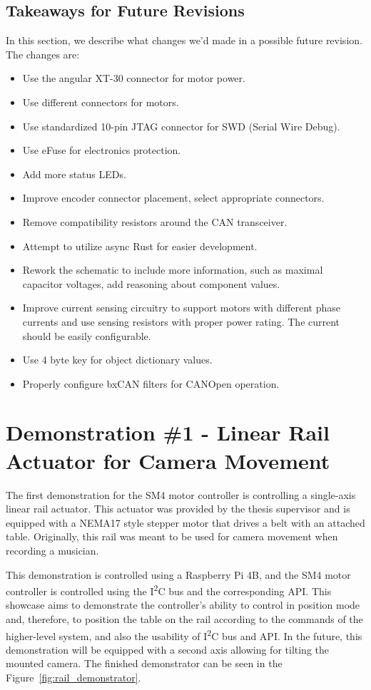 \subsection{Takeaways for Future Revisions}
\label{subsec:final_takeaways}
In this section, we describe what changes we'd made in a possible future revision.
The changes are:
\begin{itemize}
    \item Use the angular XT-30 connector for motor power.
    \item Use different connectors for motors.
    \item Use standardized 10-pin JTAG connector for SWD (Serial Wire Debug).
    \item Use eFuse for electronics protection.
    \item Add more status LEDs.
    \item Improve encoder connector placement, select appropriate connectors.
    \item Remove compatibility resistors around the CAN transceiver.
    \item Attempt to utilize async Rust for easier development.
    \item Rework the schematic to include more information, such as maximal capacitor voltages, add reasoning about component values.
    \item Improve current sensing circuitry to support motors with different phase currents and use sensing resistors with proper power rating. The current should be easily configurable.
    \item Use 4 byte key for object dictionary values.
    \item Properly configure bxCAN filters for CANOpen operation.
\end{itemize}

\section{Demonstration \#1 - Linear Rail Actuator for Camera Movement}
\label{sec:dem2}
The first demonstration for the SM4 motor controller is controlling a single-axis linear rail actuator.
This actuator was provided by the thesis supervisor and is equipped with a NEMA17 style stepper motor that drives a belt with an attached table.
Originally, this rail was meant to be used for camera movement when recording a musician.

This demonstration is controlled using a Raspberry Pi 4B, and the SM4 motor controller is controlled using the I\textsuperscript{2}C bus and the corresponding API.
This showcase aims to demonstrate the controller's ability to control in position mode and, therefore, to position the table on the rail according to the commands of the higher-level system, and also the usability of I\textsuperscript{2}C bus and API.
In the future, this demonstration will be equipped with a second axis allowing for tilting the mounted camera.
The finished demonstrator can be seen in the Figure~\ref{fig:rail_demonstrator}.

